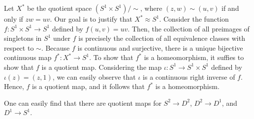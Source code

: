 \begin{exmp}
    Let $X^*$ be the quotient space $(S^1\times S^1)/\sim$, where $(z, w)\sim(u, v)$ if and only if $zw=uv$.
    Our goal is to justify that $X^*\approx S^1$.
    Consider the function $f: S^1\times S^1\rightarrow S^1$ defined by $f(u, v)=uv$.
    Then, the collection of all preimages of singletons in $S^1$ under $f$ is precisely the collection of all equivalence classes with respect to $\sim$.
    Because $f$ is continuous and surjective, there is a unique bijective continuous map $f^*: X^*\rightarrow S^1$.
    To show that $f^*$ is a homeomorphism, it suffies to show that $f$ is a quotient map.
    Considering the map $\iota: S^1\rightarrow S^1\times S^1$ defined by $\iota(z)=(z, 1)$, we can easily observe that $\iota$ is a continuous right inverse of $f$.
    Hence, $f$ is a quotient map, and it follows that $f^*$ is a homeomorphism.
\end{exmp}

\begin{exmp}
    One can easily find that there are quotient maps for $S^2\rightarrow D^2$, $D^2\rightarrow D^1$, and $D^1\rightarrow S^1$.
\end{exmp}

